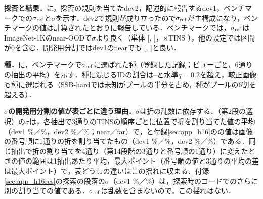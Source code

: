 \textbf{採否と結果．}に，採否の規則を当てたdev2，記述的に報告するdev1，ベンチマークでの$\sR$と$\sigma$を示す．dev2で規則が成り立ったので$\sR$が主構成になり，ベンチマークの値は計算されたとおりに報告している．ベンチマークでは，$\sR$はImageNet-1Kのnear-OODで$\sigma$より良く（単体\NRAloneNearDSig{} [\NRAloneNearDSigLo, \NRAloneNearDSigHi]，$\times$TINS \NRTinsNearDSig{}），他の設定では区間が0を含む．開発用分割ではdev1のnearでも\NRDevOneNearD{} [\NRDevOneNearDLo, \NRDevOneNearDHi]と良い．

\begin{table}[htbp]
\centering
\caption{参照画像による読み出し$\sR$と交差適合した$\sigma$（単体，dev1とdev2は5通り，ベンチマークは6通りの抽出の平均；差は$\sR-\sigma$，抽出を単位とする対応のある95\% $t$区間）．dev2の2行が登録した採否の規則の対象（区間の上端が+0.5以下）．}
\label{tab:dev}
\vspace{1.5mm}

\end{table}

\textbf{種．}に，ベンチマークで$\sR$に選ばれた種（登録した記録；ビューごと，6通りの抽出の平均）を示す．種に混じるIDの割合は\NRSeedBenchIdMin--\NRSeedBenchIdMax{}と水準$q{=}0.2$を超え，較正画像も種に選ばれる（SSB-hardでは未知がプールの半分を占め，種がプールの6割を超える）．

\begin{table}[htbp]
\centering
\caption{学習画像の較正で$\sR$に選ばれた種（ビューごと，6通りの抽出の平均）．種は種の数，プール\%はプール$\mathcal{U}=\mathcal{C}\cup\mathcal{T}$に占める割合，較正は種になった較正画像の数（2,000枚中），ID率は種に混じっていたIDの割合（実測の偽発見割合，水準$q{=}0.2$）．}
\label{tab:seeds}
\vspace{1.5mm}

\end{table}

\textbf{$\sigma$の開発用分割の値が表ごとに違う理由．}$\sigma$は折の乱数に依存する．（第2段の選択）の$\sigma$は，各抽出で3通りのTINSの順序ごとに位置で折を割り当てた値の平均（dev1 \NRFcDevOneNearPFourteen\%／\NRFcDevOneFarPFourteen\%，dev2 \NRFcDevTwoNearPFourteen\%／\NRFcDevTwoFarPFourteen\%；near／far）で，と付録\ref{sec:app_h16}のの値は画像の番号順に1通りの折を割り当てたもの（dev1 \NRFcDevOneNearPSixteen\%／\NRFcDevOneFarPSixteen\%，dev2 \NRFcDevTwoNearPSixteen\%／\NRFcDevTwoFarPSixteen\%）である．同じ抽出で折の割り当てを4通り（第14段階の3通りと番号順の1通り）に変えたときの値の範囲は1抽出あたり平均\NRFcRangeFourMean{}，最大\NRFcRangeFourMax{}ポイント（番号順の値と3通りの平均の差は最大\NRFcDevSixteenMax{}ポイント）で，表どうしの違いはこの揺れに収まる．付録\ref{sec:app_h16res}の探索の段落の$\sigma$（dev1 \NHsExplSigNear\%／\NHsExplSigFar\%）は，探索時のコードでのさらに別の割り当ての値である．$\sR$は乱数を含まないので，この揺れはない．

